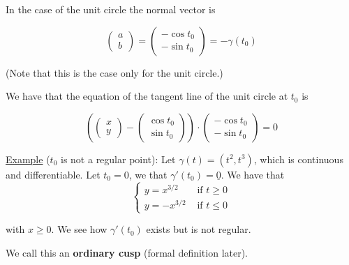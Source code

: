\documentclass[10pt]{extarticle}
\begin{document}
In the case of the unit circle the normal vector is

$$
    \begin{pmatrix}
        a \\ b
    \end{pmatrix}
    =
    \begin{pmatrix}
        -\cos t_0 \\ -\sin t_0
    \end{pmatrix}
    =
    - \gamma(t_0)
$$

(Note that this is the case only for the unit circle.)

We have that the equation of the tangent line of the unit circle at $t_0$ is

$$
    \left(
    \begin{pmatrix}
            x \\ y
        \end{pmatrix} - \begin{pmatrix}
            \cos t_0 \\ \sin t_0
        \end{pmatrix}
    \right)
    \cdot
    \begin{pmatrix}
        -\cos t_0 \\ -\sin t_0
    \end{pmatrix}
    = 0
$$

\underline{Example} ($t_0$ is not a regular point):
Let $\gamma(t) = (t^2, t^3)$, which is continuous and differentiable.
Let $t_0 = 0$, we that $\gamma'(t_0) = \underline 0$.
We have that
$$
    \begin{cases}
        y = x^{3/2}  & \text{ if } t \geq 0 \\
        y = -x^{3/2} & \text{ if } t \leq 0
    \end{cases}
$$

with $x \geq 0$. We see how $\gamma'(t_0)$ exists but is not regular.

We call this an \textbf{ordinary cusp} (formal definition later).
\end{document}

